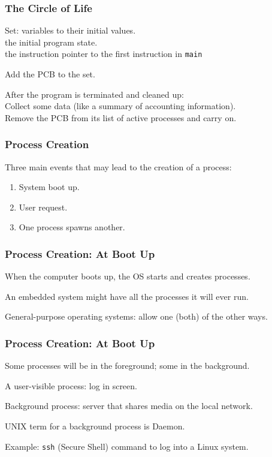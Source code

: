 \begin{frame}
	\frametitle{The Circle of Life}

	Set: variables to their initial values.\\
	\quad the initial program state.\\
	\quad the instruction pointer to the first instruction in \texttt{main}

	Add the PCB to the set.

	After the program is terminated and cleaned up:\\
	\quad Collect some data (like a summary of accounting information).\\
	\quad Remove the PCB from its list of active processes and carry on.


\end{frame}

\begin{frame}
	\frametitle{Process Creation}

	Three main events that may lead to the creation of a process:

	\begin{enumerate}
		\item System boot up.
		\item User request.
		\item One process spawns another.
	\end{enumerate}


\end{frame}

\begin{frame}
	\frametitle{Process Creation: At Boot Up}

	When the computer boots up, the OS starts and creates processes.

	An embedded system might have all the processes it will ever run.

	General-purpose operating systems: allow one (both) of the other ways.


\end{frame}

\begin{frame}
	\frametitle{Process Creation: At Boot Up}

	Some processes will be in the foreground; some in the background.

	A user-visible process: log in screen.

	Background process: server that shares media on the local network.

	UNIX term for a background process is \alert{Daemon}.

	Example: \texttt{ssh} (Secure Shell) command to log into a Linux system.


\end{frame}

